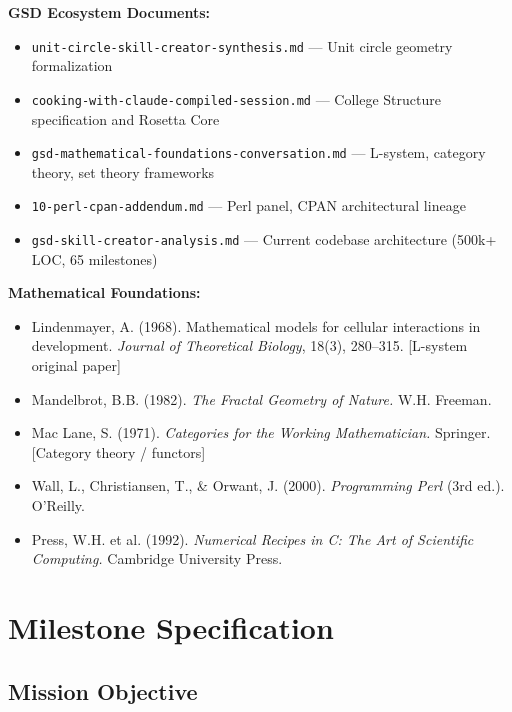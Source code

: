 \documentclass[11pt,letterpaper]{article}
\newcommand{\stageheader}[2]{%
  \noindent\colorbox{#2}{\makebox[\textwidth][l]{%
    \textcolor{white}{\bfseries\sffamily\hspace{6pt}#1\hspace{6pt}}}}%
  \vspace{0.5em}\par%
}
\begin{document}
\textbf{GSD Ecosystem Documents:}
\begin{itemize}[noitemsep]
  \item \texttt{unit-circle-skill-creator-synthesis.md} — Unit circle geometry formalization
  \item \texttt{cooking-with-claude-compiled-session.md} — College Structure specification and Rosetta Core
  \item \texttt{gsd-mathematical-foundations-conversation.md} — L-system, category theory, set theory frameworks
  \item \texttt{10-perl-cpan-addendum.md} — Perl panel, CPAN architectural lineage
  \item \texttt{gsd-skill-creator-analysis.md} — Current codebase architecture (500k+ LOC, 65 milestones)
\end{itemize}

\textbf{Mathematical Foundations:}
\begin{itemize}[noitemsep]
  \item Lindenmayer, A. (1968). Mathematical models for cellular interactions in development. \textit{Journal of Theoretical Biology}, 18(3), 280--315. [L-system original paper]
  \item Mandelbrot, B.B. (1982). \textit{The Fractal Geometry of Nature.} W.H. Freeman.
  \item Mac Lane, S. (1971). \textit{Categories for the Working Mathematician.} Springer. [Category theory / functors]
  \item Wall, L., Christiansen, T., \& Orwant, J. (2000). \textit{Programming Perl} (3rd ed.). O'Reilly.
  \item Press, W.H. et al. (1992). \textit{Numerical Recipes in C: The Art of Scientific Computing.} Cambridge University Press.
\end{itemize}

\newpage

\stageheader{STAGE 3 --- MISSION PACKAGE}{tertiary}

\section{Milestone Specification}

\subsection{Mission Objective}
\end{document}
